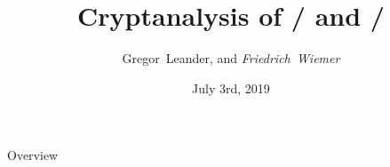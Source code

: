 \documentclass[%
    10pt,
    professionalfont,
    aspectratio=169,
]{beamer}
\title{Cryptanalysis of \clyde/ and \shadow/}
\subtitle{}
\author[Friedrich~Wiemer]{Gregor~Leander, and \emph{Friedrich~Wiemer}}
\institute{%
    Horst Görtz Institut für IT Sicherheit, Ruhr-Universität Bochum
}
\date{July 3rd, 2019}
\begin{document}
\begin{frame}
    \titlepage{}
\end{frame}

\begin{frame}{Overview}
    \tableofcontents{}
\end{frame}


\end{document}
